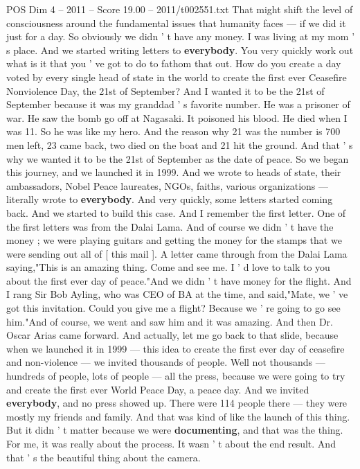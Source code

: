 \begin{textsample}{POS Dim 4 – 2011 – Score 19.00 – 2011/t002551.txt}
That might shift the level of consciousness around the fundamental issues that humanity faces — if we did it just for a day.
So obviously we didn ' t have any money.
I was living at my mom ' s place.
And we started writing letters to \textbf{everybody}.
You very quickly work out what is it that you ' ve got to do to fathom that out.
How do you create a day voted by every single head of state in the world to create the first ever Ceasefire Nonviolence Day, the 21st of September?
And I wanted it to be the 21st of September because it was my granddad ' s favorite number.
He was a prisoner of war.
He saw the bomb go off at Nagasaki.
It poisoned his blood.
He died when I was 11.
So he was like my hero.
And the reason why 21 was the number is 700 men left, 23 came back, two died on the boat and 21 hit the ground.
And that ' s why we wanted it to be the 21st of September as the date of peace.
So we began this journey, and we launched it in 1999.
And we wrote to heads of state, their ambassadors, Nobel Peace laureates, NGOs, faiths, various organizations — literally wrote to \textbf{everybody}.
And very quickly, some letters started coming back.
And we started to build this case.
And I remember the first letter.
One of the first letters was from the Dalai Lama.
And of course we didn ' t have the money ; we were playing guitars and getting the money for the stamps that we were sending out all of [ this mail ].
A letter came through from the Dalai Lama saying,"This is an amazing thing.
Come and see me.
I ' d love to talk to you about the first ever day of peace."And we didn ' t have money for the flight.
And I rang Sir Bob Ayling, who was CEO of BA at the time, and said,"Mate, we ' ve got this invitation.
Could you give me a flight?
Because we ' re going to go see him."And of course, we went and saw him and it was amazing.
And then Dr.
Oscar Arias came forward.
And actually, let me go back to that slide, because when we launched it in 1999 — this idea to create the first ever day of ceasefire and non-violence — we invited thousands of people.
Well not thousands — hundreds of people, lots of people — all the press, because we were going to try and create the first ever World Peace Day, a peace day.
And we invited \textbf{everybody}, and no press showed up.
There were 114 people there — they were mostly my friends and family.
And that was kind of like the launch of this thing.
But it didn ' t matter because we were \textbf{documenting}, and that was the thing.
For me, it was really about the process.
It wasn ' t about the end result.
And that ' s the beautiful thing about the camera.

\end{textsample}
